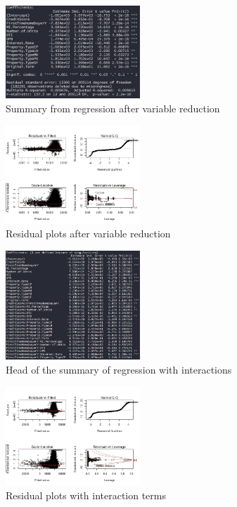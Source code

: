 \documentclass[10pt,twocolumn,letterpaper]{article}
\begin{document}
\begin{figure}
	\includegraphics[width=0.45\textwidth]{images/lm2s.jpg}
	\caption{Summary from regression after variable reduction}
	\label{fig:lm2s}
\end{figure}

\begin{figure}
	\includegraphics[width=0.45\textwidth]{images/lm1.jpeg}
	\caption{Residual plots after variable reduction}
	\label{fig:lm2c}
\end{figure}

\begin{figure}
	\includegraphics[width=0.45\textwidth]{images/lm3s.jpg}
	\caption{Head of the summary of regression with interactions}
	\label{fig:lm3s}
\end{figure}

\begin{figure}
	\includegraphics[width=0.45\textwidth]{images/lm3.jpeg}
	\caption{Residual plots with interaction terms}
	\label{fig:lm3c}
\end{figure}
\end{document}
